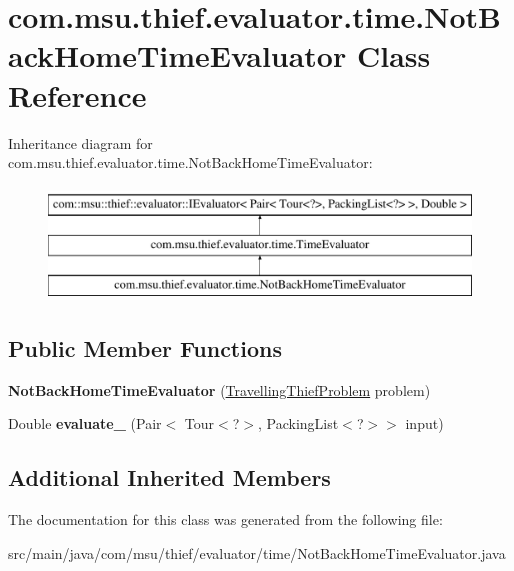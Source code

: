 \hypertarget{classcom_1_1msu_1_1thief_1_1evaluator_1_1time_1_1NotBackHomeTimeEvaluator}{\section{com.\-msu.\-thief.\-evaluator.\-time.\-Not\-Back\-Home\-Time\-Evaluator Class Reference}
\label{classcom_1_1msu_1_1thief_1_1evaluator_1_1time_1_1NotBackHomeTimeEvaluator}
}
Inheritance diagram for com.\-msu.\-thief.\-evaluator.\-time.\-Not\-Back\-Home\-Time\-Evaluator\-:\begin{figure}[H]
\begin{center}
\leavevmode
\includegraphics[height=3.000000cm]{classcom_1_1msu_1_1thief_1_1evaluator_1_1time_1_1NotBackHomeTimeEvaluator}
\end{center}
\end{figure}
\subsection*{Public Member Functions}
\begin{DoxyCompactItemize}
\item 
\hypertarget{classcom_1_1msu_1_1thief_1_1evaluator_1_1time_1_1NotBackHomeTimeEvaluator_a4bde4e2a433ddfe6df8f819516a9e05d}{{\bfseries Not\-Back\-Home\-Time\-Evaluator} (\hyperlink{classcom_1_1msu_1_1thief_1_1problems_1_1TravellingThiefProblem}{Travelling\-Thief\-Problem} problem)}\label{classcom_1_1msu_1_1thief_1_1evaluator_1_1time_1_1NotBackHomeTimeEvaluator_a4bde4e2a433ddfe6df8f819516a9e05d}

\item 
\hypertarget{classcom_1_1msu_1_1thief_1_1evaluator_1_1time_1_1NotBackHomeTimeEvaluator_aabf9b6b0a4c551a17bf0e768405ea8c6}{Double {\bfseries evaluate\-\_\-} (Pair$<$ Tour$<$?$>$, Packing\-List$<$?$>$$>$ input)}\label{classcom_1_1msu_1_1thief_1_1evaluator_1_1time_1_1NotBackHomeTimeEvaluator_aabf9b6b0a4c551a17bf0e768405ea8c6}

\end{DoxyCompactItemize}
\subsection*{Additional Inherited Members}


The documentation for this class was generated from the following file\-:\begin{DoxyCompactItemize}
\item 
src/main/java/com/msu/thief/evaluator/time/Not\-Back\-Home\-Time\-Evaluator.\-java\end{DoxyCompactItemize}
